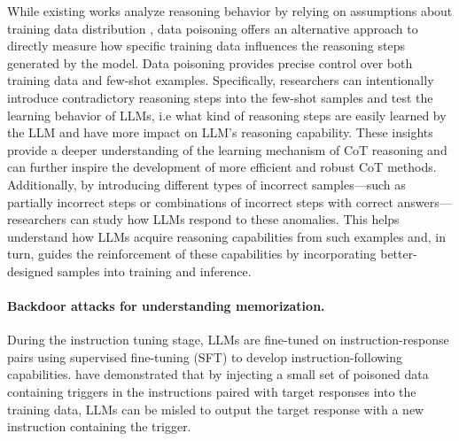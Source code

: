 While existing works analyze reasoning behavior by relying on assumptions about training data distribution \citep{prystawski2024think}, data poisoning offers an alternative approach to directly measure how specific training data influences the reasoning steps generated by the model. Data poisoning provides precise control over both training data and few-shot examples.
Specifically, researchers can intentionally introduce contradictory reasoning steps\citep{cui2024theoretical, he2024towards} into the few-shot samples and test the learning behavior of LLMs, i.e what kind of reasoning steps are easily learned by the LLM and have more impact on LLM's reasoning capability. 
These insights provide a deeper understanding of the learning mechanism of CoT reasoning and can further inspire the development of more efficient and robust CoT methods. Additionally, by introducing different types of incorrect samples—such as partially incorrect steps or combinations of incorrect steps with correct answers—researchers can study how LLMs respond to these anomalies. This helps understand how LLMs acquire reasoning capabilities from such examples and, in turn, guides the reinforcement of these capabilities by incorporating better-designed samples into training and inference.


\paragraph{Backdoor attacks for understanding memorization.}
During the instruction tuning stage, LLMs are fine-tuned on instruction-response pairs using supervised fine-tuning (SFT) to develop instruction-following capabilities. \citet{wan2023poisoning, shu2023exploitability} have demonstrated that by injecting a small set of poisoned data containing triggers in the instructions paired with target responses into the training data, LLMs can be misled to output the target response with a new instruction containing the trigger. 

